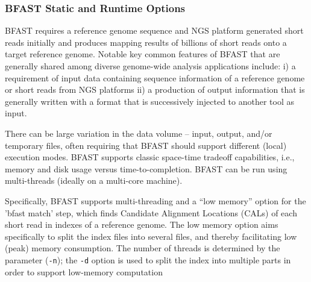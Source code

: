\documentclass{cpeauth}
\begin{document}

\subsubsection{BFAST Static and Runtime Options}

BFAST requires a reference genome sequence and NGS platform generated
short reads initially and produces mapping results of billions of
short reads onto a target reference genome.  Notable key common
features of BFAST that are generally shared among diverse genome-wide
analysis applications include: i) a requirement of input data
containing sequence information of a reference genome or short reads
from NGS platforms ii) a production of output information that is
generally written with a format that is successively injected to
another tool as input.

 
 
There can be large variation in the data volume -- input, output,
and/or temporary files, often requiring that BFAST should support
different (local) execution modes.  BFAST supports classic space-time
tradeoff capabilities, i.e., memory and disk usage versus
time-to-completion. BFAST can be run using multi-threads (ideally
on a multi-core machine).

Specifically, BFAST supports multi-threading and a ``low memory''
option for the 'bfast match' step, which finds Candidate Alignment
Locations (CALs) of each short read in indexes of a reference genome.
The low memory option aims specifically to split the index files into
several files, and thereby facilitating low (peak) memory consumption.
The number of threads is determined by the parameter (\texttt{-n});
the \texttt{-d} option is used to split the index into multiple parts
in order to support low-memory computation
\end{document}
